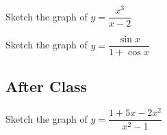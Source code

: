 \documentclass[notes]{subfiles}
\begin{document}
		\begin{ex}
			Sketch the graph of $y=\dfrac{x^3}{x-2}$
		\end{ex}

		
				\newpage
				
				
		\begin{ex}
			Sketch the graph of $y = \dfrac{\sin x}{1+\cos x}$
		\end{ex}
				\newpage
		
			
	\subsection*{After Class}	
		\begin{ex}
			Sketch the graph of $y = \dfrac{1+5x-2x^2}{x^2-1}$
		\end{ex}
			
			
		
	\clearpage
\end{document}
